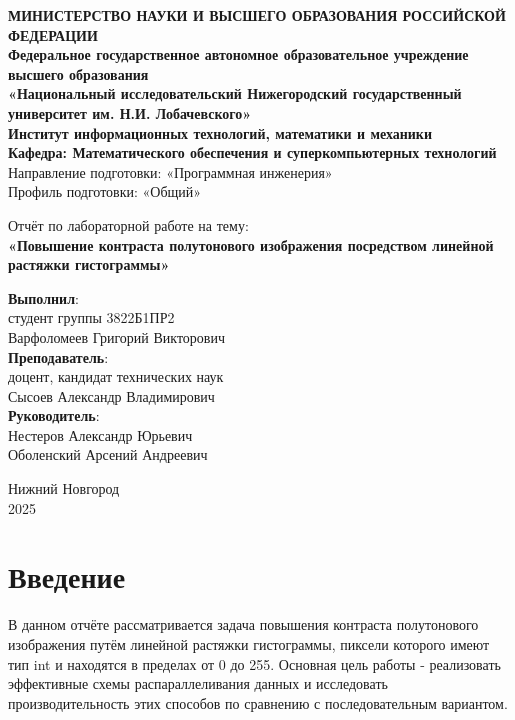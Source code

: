 \documentclass[a4paper,12pt]{article}
\begin{document}
\begin{titlepage}
\begin{center}
\textbf{МИНИСТЕРСТВО НАУКИ И ВЫСШЕГО ОБРАЗОВАНИЯ РОССИЙСКОЙ ФЕДЕРАЦИИ} \\
\textbf{Федеральное государственное автономное образовательное учреждение высшего образования} \\
\textbf{«Национальный исследовательский Нижегородский государственный университет им. Н.И. Лобачевского»} \\[1cm]
\textbf{Институт информационных технологий, математики и механики }\\[0.5cm]
\textbf{Кафедра: Математического обеспечения и суперкомпьютерных технологий}\\[0.5cm]
Направление подготовки: «Программная инженерия»\\
Профиль подготовки: «Общий»\\

\vfill

Отчёт по лабораторной работе на тему:\\
{\Large
\textbf{«Повышение контраста полутонового изображения посредством линейной растяжки гистограммы»} \\
}
\vfill
\begin{flushright}
\textbf{Выполнил}:\\
студент группы 3822Б1ПР2 \\
Варфоломеев Григорий Викторович\\
\vspace{1cm}
\textbf{Преподаватель}: \\
доцент, кандидат технических наук\\
Сысоев Александр Владимирович \\
\textbf{Руководитель}: \\
Нестеров Александр Юрьевич\\
Оболенский Арсений Андреевич\\
\end{flushright}
\vfill
Нижний Новгород \\
2025
\end{center}
\end{titlepage}



\tableofcontents
\newpage


\section{Введение}
В данном отчёте рассматривается задача повышения контраста полутонового изображения путём линейной растяжки гистограммы, пиксели которого имеют тип int и находятся в пределах от 0 до 255. Основная цель работы - реализовать эффективные схемы распараллеливания данных и исследовать производительность этих способов по сравнению с последовательным вариантом.
\newpage
\end{document}
